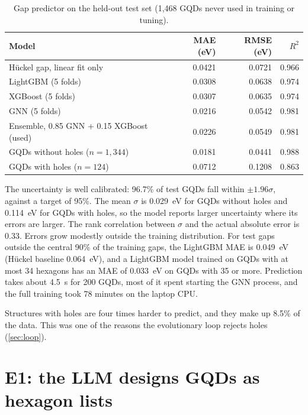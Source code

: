 \begin{table}[ht]
  \centering
  \caption{Gap predictor on the held-out test set (1{,}468 GQDs never used in training or
           tuning).}
  \label{tab:predictor}
  \small
  \begin{tabular}{@{}lrrr@{}}
    \toprule
    Model & MAE (eV) & RMSE (eV) & \(R^2\) \\
    \midrule
    H\"uckel gap, linear fit only & 0.0421 & 0.0721 & 0.966 \\
    LightGBM (5 folds) & 0.0308 & 0.0638 & 0.974 \\
    XGBoost (5 folds) & 0.0307 & 0.0635 & 0.974 \\
    GNN (5 folds) & 0.0216 & 0.0542 & 0.981 \\
    Ensemble, 0.85 GNN + 0.15 XGBoost (used) & 0.0226 & 0.0549 & 0.981 \\
    \quad GQDs without holes (\(n = 1{,}344\)) & 0.0181 & 0.0441 & 0.988 \\
    \quad GQDs with holes (\(n = 124\)) & 0.0712 & 0.1208 & 0.863 \\
    \bottomrule
  \end{tabular}
\end{table}

The uncertainty is well calibrated: 96.7\% of test GQDs fall within \(\pm1.96\sigma\), against a
target of 95\%. The mean \(\sigma\) is 0.029~eV for GQDs without holes and 0.114~eV for GQDs with
holes, so the model reports larger uncertainty where its errors are larger. The rank correlation
between \(\sigma\) and the actual absolute error is 0.33. Errors grow modestly outside the training
distribution. For test gaps outside the central 90\% of the training gaps, the LightGBM MAE is
0.049~eV (H\"uckel baseline 0.064~eV), and a LightGBM model trained on GQDs with at most 34 hexagons
has an MAE of 0.033~eV on GQDs with 35 or more. Prediction takes about 4.5~s for 200 GQDs, most of
it spent starting the GNN process, and the full training took 78 minutes on the laptop CPU.

Structures with holes are four times harder to predict, and they make up 8.5\% of the data. This
was one of the reasons the evolutionary loop rejects holes (\cref{sec:loop}).

\section{E1: the LLM designs GQDs as hexagon lists}
\label{sec:res-e1}

